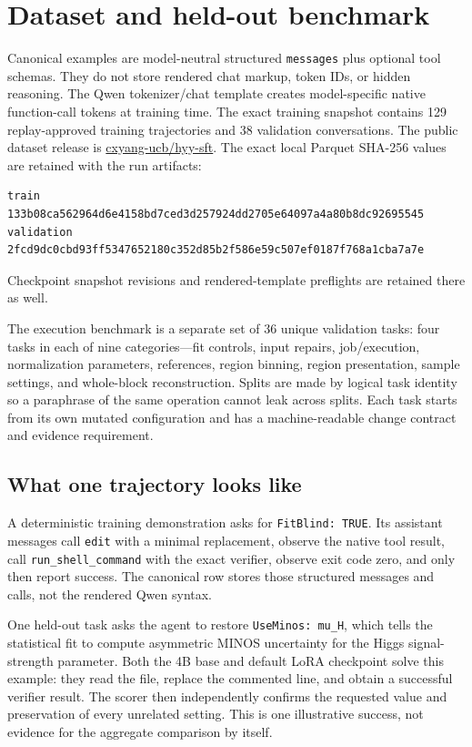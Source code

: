 \documentclass[10pt]{article}
\newcommand{\code}[1]{\texttt{#1}}
\begin{document}
\section{Dataset and held-out benchmark}
Canonical examples are model-neutral structured \code{messages} plus optional
tool schemas.  They do not store rendered chat markup, token IDs, or hidden
reasoning.  The Qwen tokenizer/chat template creates model-specific native
function-call tokens at training time.  The exact training snapshot contains
129 replay-approved training trajectories and 38 validation conversations.
The public dataset release is
\href{https://huggingface.co/datasets/cxyang-ucb/hyy-sft}{cxyang-ucb/hyy-sft}.
The exact local Parquet SHA-256 values are retained with the run artifacts:
\begin{verbatim}
train       133b08ca562964d6e4158bd7ced3d257924dd2705e64097a4a80b8dc92695545
validation  2fcd9dc0cbd93ff5347652180c352d85b2f586e59c507ef0187f768a1cba7a7e
\end{verbatim}
Checkpoint snapshot revisions and rendered-template preflights are retained
there as well.

The execution benchmark is a separate set of 36 unique validation tasks: four
tasks in each of nine categories---fit controls, input repairs, job/execution,
normalization parameters, references, region binning, region presentation,
sample settings, and whole-block reconstruction.  Splits are made by logical
task identity so a paraphrase of the same operation cannot leak across splits.
Each task starts from its own mutated configuration and has a machine-readable
change contract and evidence requirement.

\subsection{What one trajectory looks like}
A deterministic training demonstration asks for \code{FitBlind: TRUE}.  Its
assistant messages call \code{edit} with a minimal replacement, observe the
native tool result, call \code{run\_shell\_command} with the exact verifier,
observe exit code zero, and only then report success.  The canonical row stores
those structured messages and calls, not the rendered Qwen syntax.

One held-out task asks the agent to restore \code{UseMinos: mu\_H}, which tells
the statistical fit to compute asymmetric MINOS uncertainty for the Higgs
signal-strength parameter.  Both the 4B base and default LoRA checkpoint solve
this example: they read the file, replace the commented line, and obtain a
successful verifier result.  The scorer then independently confirms the
requested value and preservation of every unrelated setting.  This is one
illustrative success, not evidence for the aggregate comparison by itself.
\end{document}
